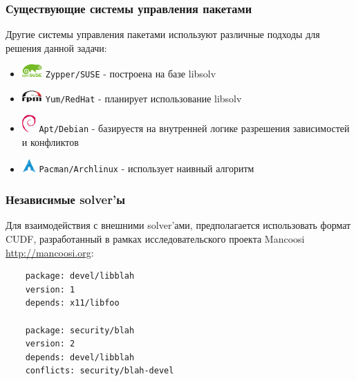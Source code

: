 \documentclass{beamer}
\begin{document}
\begin{frame}
\frametitle{Существующие системы управления пакетами}

Другие системы управления пакетами используют различные подходы для решения
данной задачи:
\begin{itemize}
  \item \includegraphics[width=22pt]{suse.pdf} \hspace{5pt} \texttt{Zypper/SUSE}
  - построена на базе libsolv
  \item \includegraphics[width=22pt]{rpm.pdf} \hspace{5pt} \texttt{Yum/RedHat} -
  планирует использование libsolv
  \item \includegraphics[width=15pt]{debian.pdf} \hspace{12pt}
  \texttt{Apt/Debian} - базируестя на внутренней логике разрешения зависимостей
  и конфликтов
  \item \includegraphics[width=15pt]{arch.pdf} \hspace{12pt}
  \texttt{Pacman/Archlinux} - использует наивный алгоритм
\end{itemize}

\end{frame}

\begin{frame}[fragile]
\frametitle{Независимые solver'ы}
Для взаимодействия с внешними solver'ами, предполагается использовать формат
CUDF, разработанный в рамках исследовательского проекта Mancoosi
\url{http://mancoosi.org}:
\bigskip
{\small
	\begin{verbatim}
	package: devel/libblah
	version: 1
	depends: x11/libfoo

	package: security/blah
	version: 2
	depends: devel/libblah
	conflicts: security/blah-devel
	
	\end{verbatim}
}
\end{frame}
\end{document}
